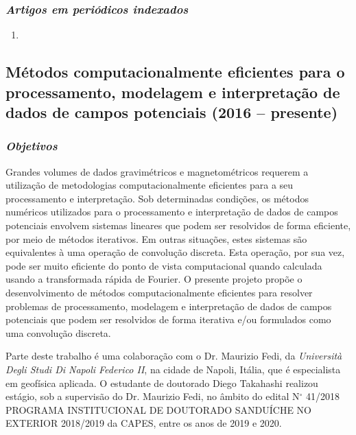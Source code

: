\subsubsection{\emph{Artigos em periódicos indexados}}

\begin{enumerate}
	\item {}
	
\end{enumerate}


\subsection{Métodos computacionalmente eficientes para o processamento, modelagem e interpretação de dados de campos potenciais (2016 -- presente)} \label{projeto-guarda-chuva-fast}

\subsubsection{\emph{Objetivos}}

Grandes volumes de dados gravimétricos e magnetométricos requerem a utilização de 
metodologias computacionalmente eficientes para a seu processamento e interpretação. 
Sob determinadas condições, os métodos numéricos utilizados para o processamento e 
interpretação de dados de campos potenciais envolvem sistemas lineares que podem 
ser resolvidos de forma eficiente, por meio de métodos iterativos. Em outras situações, 
estes sistemas são equivalentes à uma operação de convolução discreta. Esta operação, 
por sua vez, pode ser muito eficiente do ponto de vista computacional quando calculada 
usando a transformada rápida de Fourier. O presente projeto propõe o desenvolvimento 
de métodos computacionalmente eficientes para resolver problemas de  processamento, 
modelagem e interpretação de dados de campos potenciais que podem ser resolvidos de 
forma iterativa e/ou formulados como uma convolução discreta. 

Parte deste trabalho é uma colaboração com o Dr. Maurizio Fedi, da 
\textit{Università Degli Studi Di Napoli Federico II}, na cidade de Napoli, Itália, 
que é especialista em geofísica aplicada. O estudante de doutorado Diego Takahashi 
realizou estágio, sob a supervisão do Dr. Maurizio Fedi, no âmbito do edital 
N$^{\circ}$ 41/2018 PROGRAMA INSTITUCIONAL DE DOUTORADO SANDUÍCHE NO EXTERIOR 2018/2019
da CAPES, entre os anos de 2019 e 2020.

